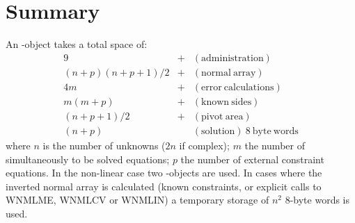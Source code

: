 \section{Summary}

An \LSQ-object takes a total space of:
\begin{eqnarray}
9 & + & (\mathrm{administration}) \nonumber \\
(n+p)(n+p+1)/2 & + & (\mathrm{normal\ array}) \nonumber \\
4m & + & (\mathrm{error\ calculations}) \nonumber \\
m(m+p) & + & (\mathrm{known\ sides}) \nonumber \\
(n+p+1)/2 & + & (\mathrm{pivot\ area}) \nonumber \\
(n+p) & & (\mathrm{solution})\ \mathrm{8\ byte\ words}
\end{eqnarray}
where $n$ is the number of unknowns ($2n$ if complex); $m$ the number of
simultaneously to be
solved equations; $p$ the number of external constraint equations.
In the non-linear case two \LSQ-objects are used. In cases where the inverted
normal array is calculated (known constraints, or explicit calls to WNMLME,
WNMLCV or WNMLIN) a temporary storage of $n^{2}$ 8-byte words is used.

